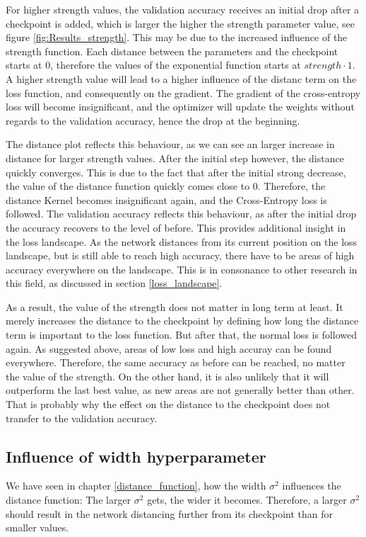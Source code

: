 For higher strength values, the validation accuracy receives an initial drop
after a checkpoint is added, which is larger the higher the strength parameter
value, see figure \ref{fig:Results_strength}. This may be due to the increased
influence of the strength function. Each distance between the parameters and the
checkpoint starts at 0, therefore the values of the exponential function starts
at $strength \cdot 1$. A higher strength value will lead to a higher influence
of the distanc term on the loss function, and consequently on the gradient. The
gradient of the cross-entropy loss will become insignificant, and the optimizer
will update the weights without regards to the validation accuracy, hence the
drop at the beginning. 

The distance plot reflects this behaviour, as we can see an larger increase in
distance for larger strength values. After the initial step however, the
distance quickly converges. This is due to the fact that after the initial
strong decrease, the value of the distance function quickly comes close to 0.
Therefore, the distance Kernel becomes insignificant again, and the
Cross-Entropy loss is followed. The validation accuracy reflects this behaviour,
as after the initial drop the accuracy recovers to the level of before. This
provides additional insight in the loss landscape. As the network distances from
its current position on the loss landscape, but is still able to reach high
accuracy, there have to be areas of high accuracy everywhere on the landscape.
This is in consonance to other research in this field, as discussed in section
\ref{loss_landscape}.

As a result, the value of the strength does not matter in long term at least. It
merely increases the distance to the checkpoint by defining how long the
distance term is important to the loss function. But after that, the normal loss
is followed again. As suggested above, areas of low loss and high accuray can
be found everywhere. Therefore, the same accuracy as before can be reached, no
matter the value of the strength. On the other hand, it is also unlikely that it
will outperform the last best value, as new areas are not generally better than
other. That is probably why the effect on the distance to the checkpoint does
not transfer to the validation accuracy.
\pagebreak



\subsection{Influence of width hyperparameter}
We have seen in chapter \ref{distance_function}, how the width $\sigma^2$
influences the distance function: The larger $\sigma^2$ gets, the wider it
becomes. Therefore, a larger $\sigma^2$ should result in the network distancing
further from its checkpoint than for smaller values.

